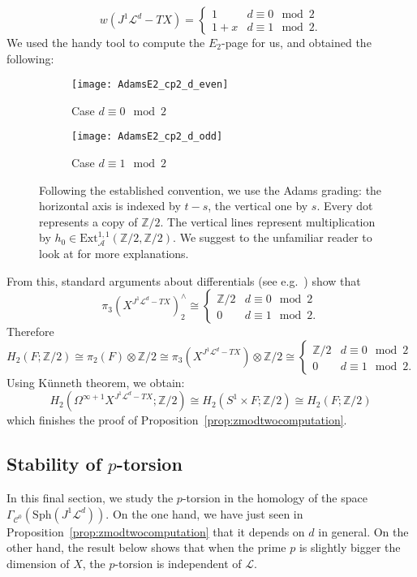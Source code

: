 \documentclass[a4paper]{amsart}
\newcommand{\bZ}{\mathbb Z}
\newcommand{\cA}{\mathcal A}
\newcommand{\cC}{\mathcal C}
\newcommand{\cL}{\mathcal L}
\newcommand{\Sph}{\mathrm{Sph}}
\theoremstyle{plain}
\theoremstyle{definition}
\begin{document}
\[
    w(J^1\cL^d - TX) = \begin{cases}1 & d \equiv 0 \mod 2 \\ 1+x & d \equiv 1 \mod 2.\end{cases}
\]
We used the handy tool \cite{chatham_spectral_nodate} to compute the $E_2$-page for us, and obtained the following:
\captionsetup[subfigure]{labelformat=simple,singlelinecheck=on,textfont=normalfont,labelsep=period}
\begin{figure}[H]
\centering
\begin{subfigure}{0.49\textwidth}
  \centering
  \texttt{[image: AdamsE2\_cp2\_d\_even]}
  \caption{Case $d \equiv 0 \mod 2$}
\end{subfigure}
\begin{subfigure}{.49\textwidth}
  \centering
  \texttt{[image: AdamsE2\_cp2\_d\_odd]}
  \caption{Case $d \equiv 1 \mod 2$}
\end{subfigure}
\caption*{Following the established convention, we use the Adams grading: the horizontal axis is indexed by $t-s$, the vertical one by $s$. Every dot represents a copy of $\bZ / 2$. The vertical lines represent multiplication by $h_0 \in \mathrm{Ext}^{1,1}_{\cA}(\bZ/2,\bZ/2)$. We suggest to the unfamiliar reader to look at \cite[Section 4.3]{beaudry_guide_2018} for more explanations.}
\end{figure}
From this, standard arguments about differentials (see e.g.~\cite[Section 4.8]{beaudry_guide_2018}) show that
\[
    \pi_3(X^{J^1\cL^d - TX})^{\wedge}_2 \cong \begin{cases}\bZ/2 & d \equiv 0 \mod 2 \\ 0 & d \equiv 1 \mod 2. \end{cases}
\]
Therefore
\[
    H_2(F;\bZ/2) \cong \pi_2(F) \otimes \bZ/2 \cong \pi_3(X^{J^1\cL^d - TX}) \otimes \bZ/2 \cong \begin{cases}\bZ/2 & d \equiv 0 \mod 2 \\ 0 & d \equiv 1 \mod 2. \end{cases}
\]
Using Künneth theorem, we obtain:
\[
    H_2(\Omega^{\infty+1} X^{J^1\cL^d - TX}; \bZ/2) \cong H_2(S^1 \times F; \bZ/2) \cong H_2(F;\bZ/2)
\]
which finishes the proof of Proposition~\ref{prop:zmodtwocomputation}.


\subsection{Stability of $p$-torsion}

In this final section, we study the $p$-torsion in the homology of the space $\Gamma_{\cC^0}\left( \Sph(J^1\cL^d) \right)$. On the one hand, we have just seen in Proposition~\ref{prop:zmodtwocomputation} that it depends on $d$ in general. On the other hand, the result below shows that when the prime $p$ is slightly bigger the dimension of $X$, the $p$-torsion is independent of $\cL$.
\end{document}
